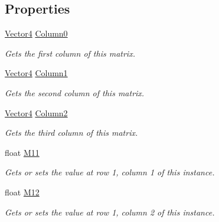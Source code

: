 \subsection*{Properties}
\begin{DoxyCompactItemize}
\item 
\hyperlink{struct_open_t_k_1_1_vector4}{Vector4} \hyperlink{struct_open_t_k_1_1_matrix4x3_a386da1026761e5cc8faa795cb10867a5}{Column0}
\begin{DoxyCompactList}\small\item\em Gets the first column of this matrix. \end{DoxyCompactList}\item 
\hyperlink{struct_open_t_k_1_1_vector4}{Vector4} \hyperlink{struct_open_t_k_1_1_matrix4x3_a3006bfcf6410491cee26015c06bfe954}{Column1}
\begin{DoxyCompactList}\small\item\em Gets the second column of this matrix. \end{DoxyCompactList}\item 
\hyperlink{struct_open_t_k_1_1_vector4}{Vector4} \hyperlink{struct_open_t_k_1_1_matrix4x3_aa2329728c5e8e7fc095cd158b892e2bf}{Column2}
\begin{DoxyCompactList}\small\item\em Gets the third column of this matrix. \end{DoxyCompactList}\item 
float \hyperlink{struct_open_t_k_1_1_matrix4x3_a22f5fa5f1e12fdd947010ed03e3e3be7}{M11}
\begin{DoxyCompactList}\small\item\em Gets or sets the value at row 1, column 1 of this instance. \end{DoxyCompactList}\item 
float \hyperlink{struct_open_t_k_1_1_matrix4x3_a770f094c0ce30c9152654a6a76d73fd8}{M12}
\begin{DoxyCompactList}\small\item\em Gets or sets the value at row 1, column 2 of this instance. \end{DoxyCompactList}\item 

\end{DoxyCompactItemize}
